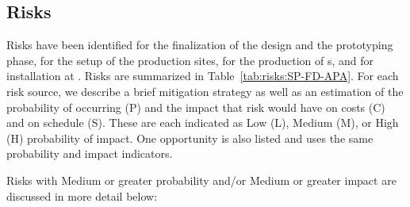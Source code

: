 \subsection{Risks}
\label{sec:fdsp-apa-cost-sched-risks}

Risks have been identified for the finalization of the  design and the prototyping phase, for the setup of the production sites, for the production of s, and for installation at .  Risks are summarized in Table~\ref{tab:risks:SP-FD-APA}.  For each risk source, we describe a brief mitigation strategy as well as an estimation of the probability of occurring (P) and the impact that risk would have on costs (C) and on schedule (S).  These are each indicated as Low (L), Medium (M), or High (H) probability of impact. One opportunity is also listed and uses the same probability and impact indicators.



Risks with Medium or greater probability and/or Medium or greater impact are discussed in more detail below:

